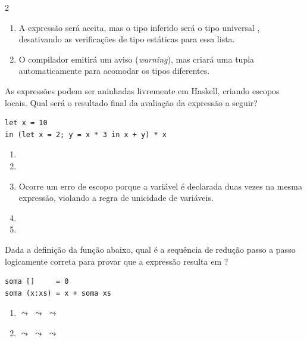 \documentclass[a4paper,10pt,brazil]{article}
\begin{document}
\begin{multicols}{2}
\begin{enumerate}
  \item A expressão será aceita, mas o tipo inferido será o tipo universal , desativando as verificações de tipo estáticas para essa lista.

  \item O compilador emitirá um aviso (\emph{warning}), mas criará uma tupla automaticamente para acomodar os tipos diferentes.


\end{enumerate}

As expressões  podem ser aninhadas livremente em Haskell, criando escopos locais. Qual será o resultado final da avaliação da expressão a seguir?
\begin{verbatim}
let x = 10 
in (let x = 2; y = x * 3 in x + y) * x
\end{verbatim}

\begin{enumerate}
  \item {}

  \item {}

  \item Ocorre um erro de escopo porque a variável  é declarada duas vezes na mesma expressão, violando a regra de unicidade de variáveis.

  \item {}

  \item {}


\end{enumerate}

Dada a definição da função  abaixo, qual é a sequência de redução passo a passo logicamente correta para provar que a expressão  resulta em ?

\begin{verbatim}
soma []     = 0
soma (x:xs) = x + soma xs
\end{verbatim}

\begin{enumerate}
  \item {} $\leadsto$  $\leadsto$  $\leadsto$ 

  \item {} $\leadsto$  $\leadsto$  $\leadsto$ 


\end{enumerate}
\end{multicols}
\end{document}
